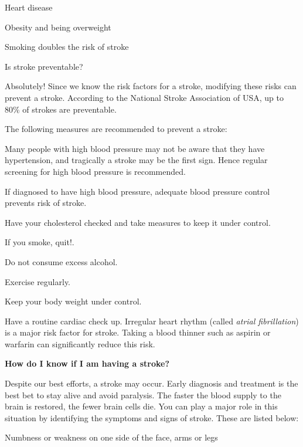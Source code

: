 { \item Heart disease

 \item Obesity and being overweight

 \item Smoking doubles the risk of stroke

Is stroke preventable?

Absolutely! Since we know the risk factors for a stroke, modifying these risks can prevent a stroke. According to the National Stroke Association of USA, up to 80\% of strokes are preventable.

The following measures are recommended to prevent a stroke:

\item Many people with high blood pressure may not be aware that they have hypertension, and tragically a stroke may be the first sign. Hence regular screening for high blood pressure is recommended.

 \item If diagnosed to have high blood pressure, adequate blood pressure control prevents risk of stroke.

 \item Have your cholesterol checked and take measures to keep it under control.

 \item If you smoke, quit!.

 \item Do not consume excess alcohol.

 \item Exercise regularly.

 \item Keep your body weight under control.

 \item Have a routine cardiac check up. Irregular heart rhythm (called \textit{atrial fibrillation}) is a major risk factor for stroke. Taking a blood thinner such as aspirin or warfarin can significantly reduce this risk.

\textbf{How do I know if I am having a stroke?}

Despite our best efforts, a stroke may occur. Early diagnosis and treatment is the best bet to stay alive and avoid paralysis. The faster the blood supply to the brain is restored, the fewer brain cells die. You can play a major role in this situation by identifying the symptoms and signs of stroke. These are listed below:

\item Numbness or weakness on one side of the face, arms or legs

}
